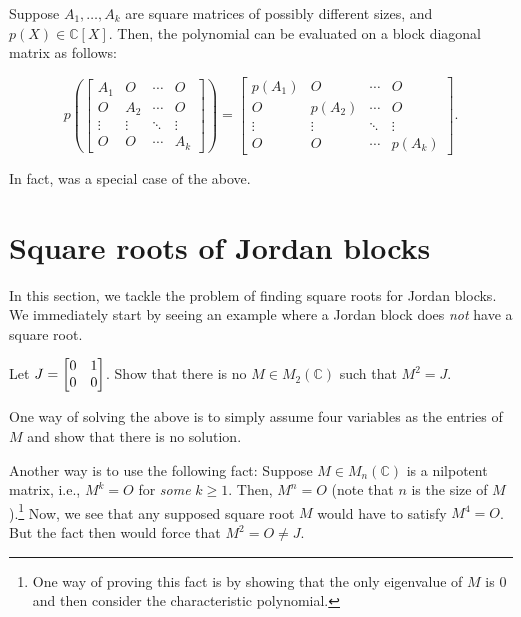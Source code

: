 \documentclass[12pt]{article}
\begin{document}
\begin{thm} \label{thm:block-diagonal-polynomial}
	Suppose $A_{1}, \ldots, A_{k}$ are square matrices of possibly different sizes, and $p(X) \in \mathbb{C}[X]$. Then, the polynomial can be evaluated on a block diagonal matrix as follows:

	\begin{equation*} 
		p\left(\begin{bmatrix}
					A_{1} & O & \cdots & O \\
					O & A_{2} & \cdots & O \\
					\vdots & \vdots & \ddots & \vdots \\
					O & O & \cdots & A_{k}
				\end{bmatrix}\right)
		=
		\begin{bmatrix}
			p(A_{1}) & O & \cdots & O \\
			O & p(A_{2}) & \cdots & O \\
			\vdots & \vdots & \ddots & \vdots \\
			O & O & \cdots & p(A_{k})
		\end{bmatrix}.
	\end{equation*}
\end{thm}

In fact,  was a special case of the above.

\section{Square roots of Jordan blocks} \label{sec:square-root-Jordan}

In this section, we tackle the problem of finding square roots for Jordan blocks. We immediately start by seeing an example where a Jordan block does \emph{not} have a square root.

\begin{exe} \label{exe:inexistence-of-square-root}
	Let $J = \begin{bmatrix} 0 & 1 \\ 0 & 0 \end{bmatrix}$. Show that there is no $M \in M_{2}(\mathbb{C})$ such that $M^{2} = J$.
\end{exe}
\begin{soln}
	One way of solving the above is to simply assume four variables as the entries of $M$ and show that there is no solution. 

	Another way is to use the following fact: Suppose $M \in M_{n}(\mathbb{C})$ is a nilpotent matrix, i.e., $M^{k} = O$ for \emph{some} $k \ge 1$. Then, $M^{n} = O$ (note that $n$ is the size of $M$).\footnote{One way of proving this fact is by showing that the only eigenvalue of $M$ is $0$ and then consider the characteristic polynomial.} \newline
	Now, we see that any supposed square root $M$ would have to satisfy $M^{4} = O$. But the fact then would force that $M^{2} = O \neq J$.
\end{soln}
\end{document}
